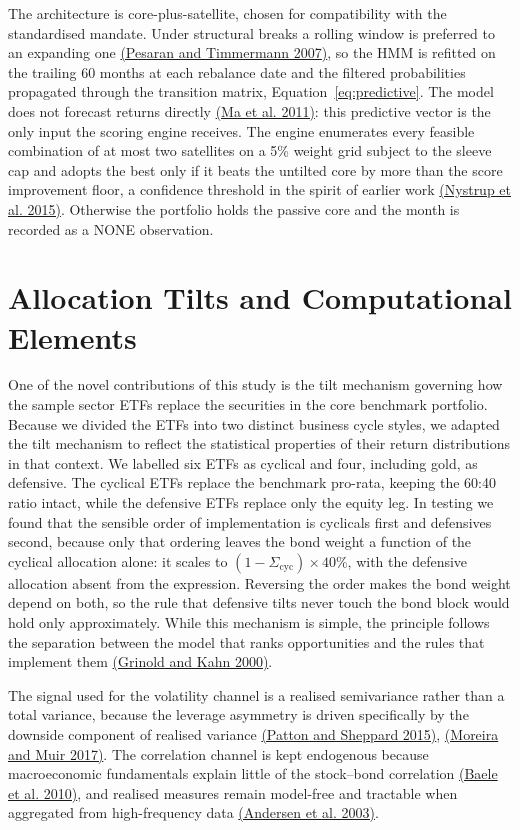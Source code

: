 \documentclass[11pt, a4paper]{article}
\newcommand{\cit}[2]{\hyperlink{ref:#1}{\textcolor{elsblue}{#2}}}
\begin{document}
The architecture is core-plus-satellite, chosen for compatibility with the standardised
mandate. Under structural breaks a rolling window is preferred to an expanding one \cit{pesaran2007}{(Pesaran and Timmermann 2007)}, so the HMM is refitted on the trailing 60 months at each rebalance date
and the filtered probabilities propagated through the transition matrix,
Equation~\eqref{eq:predictive}. The model does not forecast
returns directly \cit{ma2011}{(Ma et al. 2011)}: this predictive vector is the only input the scoring engine receives. The
engine enumerates every feasible combination of at most two satellites on a 5\% weight grid
subject to the sleeve cap and adopts the best only if it beats the untilted core by more than
the score improvement floor, a confidence threshold in the spirit of earlier work \cit{nystrup2015}{(Nystrup et al. 2015)}.
Otherwise the portfolio holds the passive core and the month is recorded as a NONE
observation.

\section{Allocation Tilts and Computational Elements}
\label{sec:tilts}

One of the novel contributions of this study is the tilt mechanism governing how the
sample sector ETFs replace the securities in the core benchmark portfolio. Because we divided
the ETFs into two distinct business cycle styles, we adapted the tilt mechanism to reflect the
statistical properties of their return distributions in that context. We labelled six ETFs as
cyclical and four, including gold, as defensive. The cyclical ETFs replace the benchmark
pro-rata, keeping the 60:40 ratio intact, while the defensive ETFs replace only the equity leg.
In testing we found that the sensible order of implementation is cyclicals first and defensives
second, because only that ordering leaves the bond weight a function of the cyclical allocation
alone: it scales to $(1-\Sigma_{\mathrm{cyc}})\times 40\%$, with the defensive allocation absent
from the expression. Reversing the order makes the bond weight depend on both, so the rule that
defensive tilts never touch the bond block would hold only approximately. While this mechanism
is simple, the principle follows the separation between the model that
ranks opportunities and the rules that implement them \cit{grinold2000}{(Grinold and Kahn 2000)}.

The signal used for the volatility channel is a realised semivariance rather than a total
variance, because the leverage asymmetry is driven specifically by the downside component
of realised variance \cit{patton2015}{(Patton and Sheppard 2015)}, \cit{moreira2017}{(Moreira and Muir 2017)}. The correlation
channel is kept endogenous because macroeconomic fundamentals explain little of the
stock--bond correlation \cit{baele2010}{(Baele et al. 2010)}, and realised measures
remain model-free and tractable when aggregated from high-frequency data \cit{andersen2003}{(Andersen et al. 2003)}.
\end{document}
